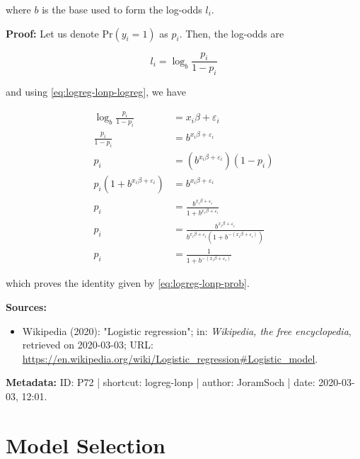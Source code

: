 \documentclass[a4paper,12pt,twoside]{book}
\begin{document}
where $b$ is the base used to form the log-odds $l_i$.


\vspace{1em}
\textbf{Proof:} Let us denote $\mathrm{Pr}(y_i = 1)$ as $p_i$. Then, the log-odds are

\begin{equation} \label{eq:logreg-lonp-lodds}
l_i = \log_b \frac{p_i}{1-p_i}
\end{equation}

and using \eqref{eq:logreg-lonp-logreg}, we have

\begin{equation} \label{eq:logreg-lonp-prob-qed}
\begin{split}
\log_b \frac{p_i}{1-p_i} &= x_i \beta + \varepsilon_i \\
\frac{p_i}{1-p_i} &= b^{x_i \beta + \varepsilon_i} \\
p_i &= \left( b^{x_i \beta + \varepsilon_i} \right) (1-p_i) \\
p_i \left( 1 + b^{x_i \beta + \varepsilon_i} \right) &= b^{x_i \beta + \varepsilon_i} \\
p_i &= \frac{b^{x_i \beta + \varepsilon_i}}{1 + b^{x_i \beta + \varepsilon_i}} \\
p_i &= \frac{b^{x_i \beta + \varepsilon_i}}{b^{x_i \beta + \varepsilon_i} \left( 1 + b^{-(x_i \beta + \varepsilon_i)} \right)} \\
p_i &= \frac{1}{1 + b^{-(x_i \beta + \varepsilon_i)}}
\end{split}
\end{equation}

which proves the identity given by \eqref{eq:logreg-lonp-prob}.


\vspace{1em}
\textbf{Sources:}
\begin{itemize}
\item Wikipedia (2020): "Logistic regression"; in: \textit{Wikipedia, the free encyclopedia}, retrieved on 2020-03-03; URL: \url{https://en.wikipedia.org/wiki/Logistic_regression#Logistic_model}.
\end{itemize}


\vspace{1em}
\textbf{Metadata:} ID: P72 | shortcut: logreg-lonp | author: JoramSoch | date: 2020-03-03, 12:01.
\vspace{1em}





\chapter{Model Selection} \label{sec:Model Selection} \newpage
\end{document}
